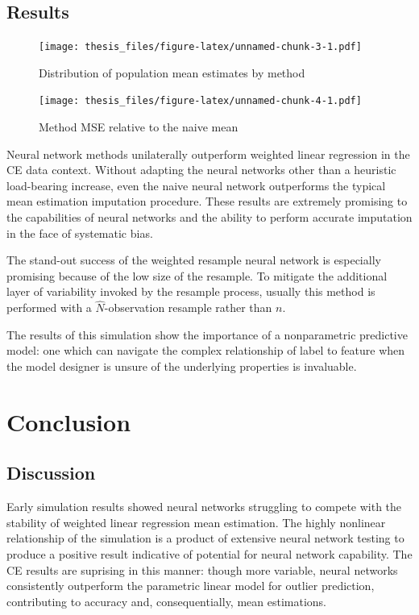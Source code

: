 \documentclass[12pt,twoside]{reedthesis}
\begin{document}
\section{Results}\label{results}
\begin{figure}
\centering
\texttt{[image: thesis\_files/figure-latex/unnamed-chunk-3-1.pdf]}
\caption{\label{fig:unnamed-chunk-3}Distribution of population mean
estimates by method}
\end{figure}
\begin{figure}
\centering
\texttt{[image: thesis\_files/figure-latex/unnamed-chunk-4-1.pdf]}
\caption{\label{fig:unnamed-chunk-4}Method MSE relative to the naive mean}
\end{figure}
Neural network methods unilaterally outperform weighted linear
regression in the CE data context. Without adapting the neural networks
other than a heuristic load-bearing increase, even the naive neural
network outperforms the typical mean estimation imputation procedure.
These results are extremely promising to the capabilities of neural
networks and the ability to perform accurate imputation in the face of
systematic bias.

The stand-out success of the weighted resample neural network is
especially promising because of the low size of the resample. To
mitigate the additional layer of variability invoked by the resample
process, usually this method is performed with a \(\hat{N}\)-observation
resample rather than \(n\).

The results of this simulation show the importance of a nonparametric
predictive model: one which can navigate the complex relationship of
label to feature when the model designer is unsure of the underlying
properties is invaluable.

\chapter{Conclusion}\label{conclusion}

\section{Discussion}\label{discussion}

Early simulation results showed neural networks struggling to compete
with the stability of weighted linear regression mean estimation. The
highly nonlinear relationship of the simulation is a product of
extensive neural network testing to produce a positive result indicative
of potential for neural network capability. The CE results are suprising
in this manner: though more variable, neural networks consistently
outperform the parametric linear model for outlier prediction,
contributing to accuracy and, consequentially, mean estimations.
\end{document}
